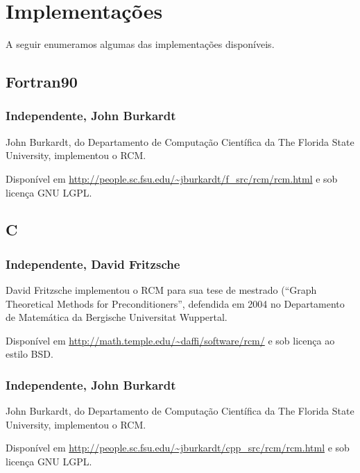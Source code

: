 % 
% 
% 

\section{Implementações}
A seguir enumeramos algumas das implementações disponíveis.

\subsection{Fortran90}
\subsubsection{Independente, John Burkardt}
John Burkardt, do Departamento de Computação Científica da The Florida State
University, implementou o RCM.

Disponível em \url{http://people.sc.fsu.edu/~jburkardt/f_src/rcm/rcm.html} e
sob licença GNU LGPL.

\subsection{C}
\subsubsection{Independente, David Fritzsche}
David Fritzsche implementou o RCM para sua tese de mestrado (``Graph
Theoretical Methods for Preconditioners'', defendida em 2004 no
Departamento de Matemática da Bergische Universitat Wuppertal. 

Disponível em \url{http://math.temple.edu/~daffi/software/rcm/} e sob licença ao
estilo BSD.

\subsubsection{Independente, John Burkardt}
John Burkardt, do Departamento de Computação Científica da The Florida State
University, implementou o RCM.

Disponível em \url{http://people.sc.fsu.edu/~jburkardt/cpp_src/rcm/rcm.html} e
sob licença GNU LGPL.

